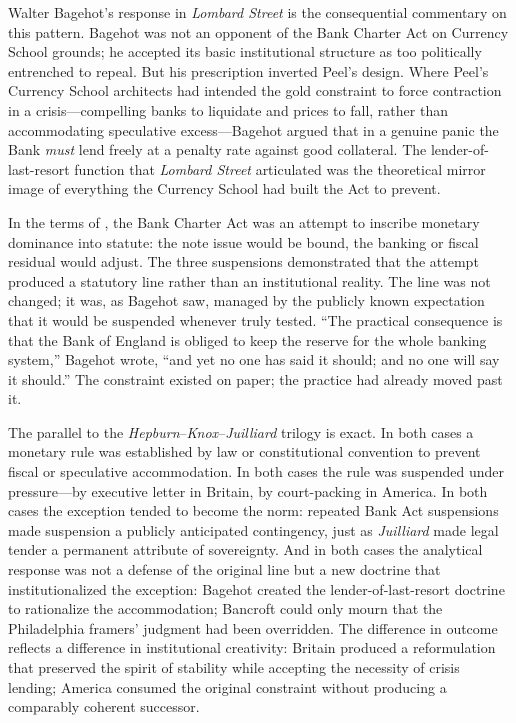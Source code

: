 \documentclass[12pt]{article}
\begin{document}
Walter Bagehot's response in \textit{Lombard Street} \citep{Bagehot1873}
is the consequential commentary on this
pattern.  Bagehot was not an opponent of the Bank Charter Act on
Currency School grounds; he accepted its basic institutional structure
as too politically entrenched to repeal.  But his prescription inverted
Peel's design.  Where Peel's Currency School architects had intended the
gold constraint to force contraction in a crisis---compelling banks to
liquidate and prices to fall, rather than accommodating speculative
excess---Bagehot argued that in a genuine panic the Bank \emph{must}
lend freely at a penalty rate against good collateral.  The lender-of-
last-resort function that \textit{Lombard Street} articulated was the
theoretical mirror image of everything the Currency School had built the
Act to prevent.

In the terms of \citet{Sargent2011}, the Bank Charter Act was an attempt
to inscribe monetary dominance into statute: the note issue would be
bound, the banking or fiscal residual would adjust.  The three
suspensions demonstrated that the attempt produced a statutory line
rather than an institutional reality.  The line was not changed; it was,
as Bagehot saw, managed by the publicly known expectation that it would
be suspended whenever truly tested.  ``The practical consequence is
that the Bank of England is obliged to keep the reserve for the whole
banking system,'' Bagehot wrote, ``and yet no one has said it should;
and no one will say it should.''  The constraint existed on paper; the
practice had already moved past it.

The parallel to the \textit{Hepburn}--\textit{Knox}--\textit{Juilliard}
trilogy is exact.  In both cases a monetary rule was established by law
or constitutional convention to prevent fiscal or speculative
accommodation.  In both cases the rule was suspended under pressure---by
executive letter in Britain, by court-packing in America.  In both cases
the exception tended to become the norm: repeated Bank Act suspensions
made suspension a publicly anticipated contingency, just as
\textit{Juilliard} made legal tender a permanent attribute of sovereignty.
And in both cases the analytical response was not a
defense of the original line but a new doctrine that institutionalized
the exception: Bagehot created the lender-of-last-resort doctrine to
rationalize the accommodation; Bancroft could only mourn that the
Philadelphia framers' judgment had been overridden.  The difference in
outcome reflects a difference in institutional creativity: Britain
produced a reformulation that preserved the spirit of stability while
accepting the necessity of crisis lending; America consumed the original
constraint without producing a comparably coherent successor.
\end{document}
